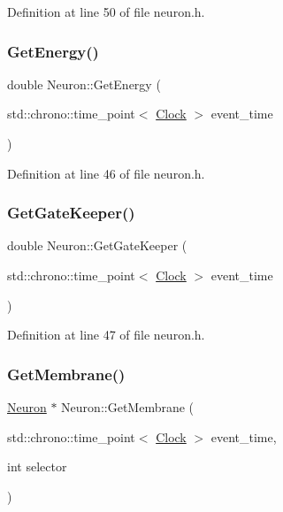 Definition at line 50 of file neuron.\+h.

\mbox{\label{class_neuron_a91dd5325856e246d98c2864e1c955972}} 
\subsubsection{\texorpdfstring{Get\+Energy()}{GetEnergy()}}
{\footnotesize\ttfamily double Neuron\+::\+Get\+Energy (\begin{DoxyParamCaption}\item[{std\+::chrono\+::time\+\_\+point$<$ \mbox{\hyperlink{universe_8h_a0ef8d951d1ca5ab3cfaf7ab4c7a6fd80}{Clock}} $>$}]{event\+\_\+time }\end{DoxyParamCaption})\hspace{0.3cm}{\ttfamily [inline]}}



Definition at line 46 of file neuron.\+h.

\mbox{\label{class_neuron_a94accac3223afdecd1edf25e6db59ace}} 
\subsubsection{\texorpdfstring{Get\+Gate\+Keeper()}{GetGateKeeper()}}
{\footnotesize\ttfamily double Neuron\+::\+Get\+Gate\+Keeper (\begin{DoxyParamCaption}\item[{std\+::chrono\+::time\+\_\+point$<$ \mbox{\hyperlink{universe_8h_a0ef8d951d1ca5ab3cfaf7ab4c7a6fd80}{Clock}} $>$}]{event\+\_\+time }\end{DoxyParamCaption})\hspace{0.3cm}{\ttfamily [inline]}}



Definition at line 47 of file neuron.\+h.

\mbox{\label{class_neuron_a5bc4e67c5f2d8a3bcd160aa3f5086aec}} 
\subsubsection{\texorpdfstring{Get\+Membrane()}{GetMembrane()}}
{\footnotesize\ttfamily \mbox{\hyperlink{class_neuron}{Neuron}} $\ast$ Neuron\+::\+Get\+Membrane (\begin{DoxyParamCaption}\item[{std\+::chrono\+::time\+\_\+point$<$ \mbox{\hyperlink{universe_8h_a0ef8d951d1ca5ab3cfaf7ab4c7a6fd80}{Clock}} $>$}]{event\+\_\+time,  }\item[{int}]{selector }\end{DoxyParamCaption})}



